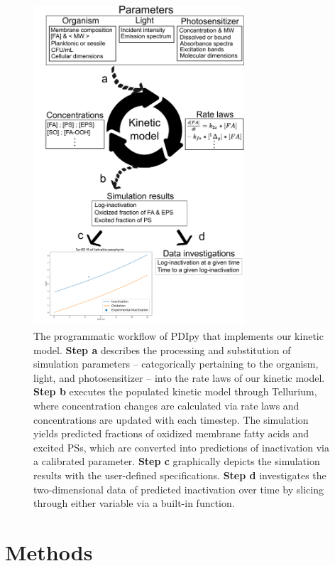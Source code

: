 \begin{figure}
    \centering
    \includegraphics[width = 0.7\textwidth]{images/PDIpy/background/workflow_2.png}
    \caption{
        The programmatic workflow of PDIpy that implements our kinetic model. \textbf{Step a} describes the processing and substitution of simulation parameters -- categorically pertaining to the organism, light, and photosensitizer -- into the rate laws of our kinetic model. \textbf{Step b} executes the populated kinetic model through Tellurium, where concentration changes are calculated via rate laws and concentrations are updated with each timestep. The simulation yields predicted fractions of oxidized membrane fatty acids and excited PSs, which are converted into predictions of inactivation via a calibrated parameter. \textbf{Step c} graphically depicts the simulation results with the user-defined specifications. \textbf{Step d} investigates the two-dimensional data of predicted inactivation over time by slicing through either variable via a built-in function.
    }
    \label{pdi_workflow}
\end{figure}

\section{Methods} \label{methods}
